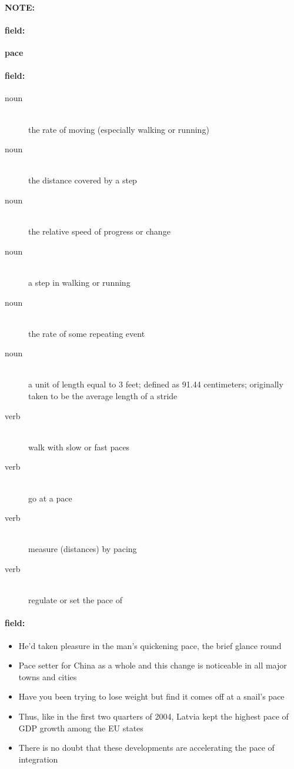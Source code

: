\documentclass[12pt]{article}
\newenvironment{note}{\paragraph{NOTE:}}{}
\newenvironment{field}{\paragraph{field:}}{}
\begin{document}
\begin{note}
\begin{field}
\textbf{\large pace}
\end{field}


\begin{field}
\begin{description}
\item[noun] \hfill \\ 
the rate of moving (especially walking or running)

\item[noun] \hfill \\ 
the distance covered by a step

\item[noun] \hfill \\ 
the relative speed of progress or change

\item[noun] \hfill \\ 
a step in walking or running

\item[noun] \hfill \\ 
the rate of some repeating event

\item[noun] \hfill \\ 
a unit of length equal to 3 feet; defined as 91.44 centimeters; originally taken to be the average length of a stride

\item[verb] \hfill \\ 
walk with slow or fast paces

\item[verb] \hfill \\ 
go at a pace

\item[verb] \hfill \\ 
measure (distances) by pacing

\item[verb] \hfill \\ 
regulate or set the pace of

\end{description}
\end{field}

\begin{field}
\begin{itemize}
\item He'd taken pleasure in the man's quickening pace, the brief glance round
\item Pace setter for China as a whole and this change is noticeable in all major towns and cities
\item Have you been trying to lose weight but find it comes off at a snail's pace
\item Thus, like in the first two quarters of 2004, Latvia kept the highest pace of GDP growth among the EU states
\item There is no doubt that these developments are accelerating the pace of integration
\end{itemize}
\end{field}
\end{note}
\end{document}
